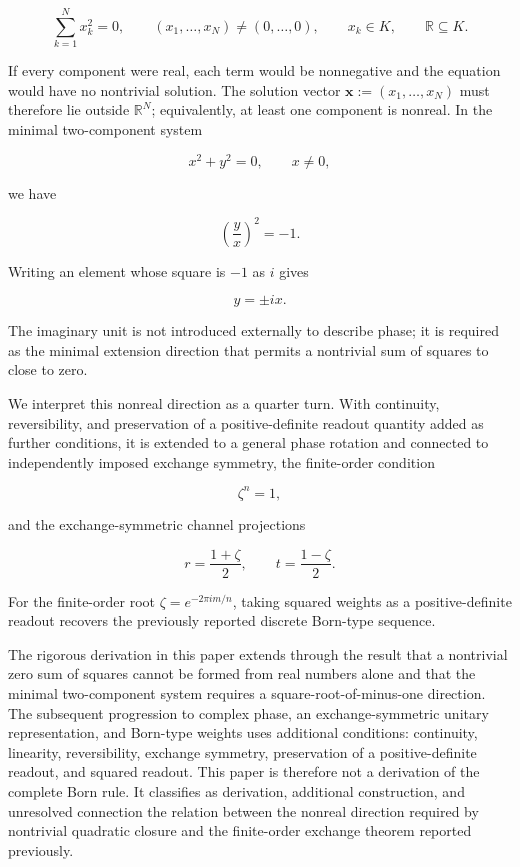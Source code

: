 \documentclass[
  a4paper,
  10pt]{article}
\begin{document}
\[
\boxed{
\sum_{k=1}^{N}x_k^2=0,
\qquad
(x_1,\ldots,x_N)\neq(0,\ldots,0),
\qquad
x_k\in K,
\qquad
\mathbb R\subseteq K
}.
\]

If every component were real, each term would be nonnegative and the
equation would have no nontrivial solution. The solution vector
\(\mathbf{x}:=(x_1,\ldots,x_N)\) must therefore lie outside
\(\mathbb R^N\); equivalently, at least one component is nonreal. In the
minimal two-component system

\[
x^2+y^2=0,
\qquad x\neq0,
\]

we have

\[
\left(\frac{y}{x}\right)^2=-1.
\]

Writing an element whose square is \(-1\) as \(i\) gives

\[
y=\pm ix.
\]

The imaginary unit is not introduced externally to describe phase; it is
required as the minimal extension direction that permits a nontrivial
sum of squares to close to zero.

We interpret this nonreal direction as a quarter turn. With continuity,
reversibility, and preservation of a positive-definite readout quantity
added as further conditions, it is extended to a general phase rotation
and connected to independently imposed exchange symmetry, the
finite-order condition

\[
\zeta^n=1,
\]

and the exchange-symmetric channel projections

\[
r=\frac{1+\zeta}{2},
\qquad
t=\frac{1-\zeta}{2}.
\]

For the finite-order root \(\zeta=e^{-2\pi im/n}\), taking squared
weights as a positive-definite readout recovers the previously reported
discrete Born-type sequence.

The rigorous derivation in this paper extends through the result that a
nontrivial zero sum of squares cannot be formed from real numbers alone
and that the minimal two-component system requires a
square-root-of-minus-one direction. The subsequent progression to
complex phase, an exchange-symmetric unitary representation, and
Born-type weights uses additional conditions: continuity, linearity,
reversibility, exchange symmetry, preservation of a positive-definite
readout, and squared readout. This paper is therefore not a derivation
of the complete Born rule. It classifies as derivation, additional
construction, and unresolved connection the relation between the nonreal
direction required by nontrivial quadratic closure and the finite-order
exchange theorem reported previously.
\end{document}
